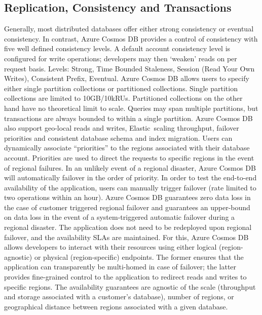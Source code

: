 \subsection{Replication, Consistency and Transactions}
Generally, most distributed databases offer either strong consistency or eventual consistency. In contrast, Azure Cosmos DB provides a control of consistency with five well defined consistency levels. A default account consistency level is configured for write operations; developers may then ‘weaken’ reads on per request basis. Levels: Strong, Time Bounded Staleness, Session (Read Your Own Writes), Consistent Prefix, Eventual.
Azure Cosmos DB allows users to specify either single partition collections or partitioned collections. Single partition collections are limited to 10GB/10kRUs. Partitioned collections on the other hand have no theoretical limit to scale. Queries may span multiple partitions, but transactions are always bounded to within a single partition.
Azure Cosmos DB also support geo-local reads and writes, Elastic scaling throughput, failover priorities and consistent database schema and index migration.
Users can dynamically associate “priorities” to the regions associated with their database account. Priorities are used to direct the requests to specific regions in the event of regional failures. In an unlikely event of a regional disaster, Azure Cosmos DB will automatically failover in the order of priority. In order to test the end-to-end availability of the application, users can manually trigger failover (rate limited to two operations within an hour). Azure Cosmos DB guarantees zero data loss in the case of customer triggered regional failover and guarantees an upper-bound on data loss in the event of a system-triggered automatic failover during a regional disaster. The application does not need to be redeployed upon regional failover, and the availability SLAs are maintained. For this, Azure Cosmos DB allows developers to interact with their resources using either logical (region-agnostic) or physical (region-specific) endpoints. The former ensures that the application can transparently be multi-homed in case of failover; the latter provides fine-grained control to the application to redirect reads and writes to specific regions. The availability guarantees are agnostic of the scale (throughput and storage associated with a customer’s database), number of regions, or geographical distance between regions associated with a given database.

